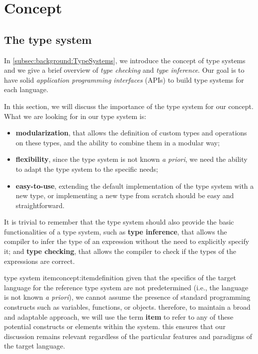 \chapter{Concept}\label{chap:Concept}

\section{The type system}\label{sec:concept:TheTypeSystem}

In \ref{subsec:background:TypeSystems}, we introduce the concept of type systems and we give a brief overview of \textit{type checking} and \textit{type inference}. Our goal is to have solid \textit{application programming interfaces} (APIs) to build type systems for each language.

In this section, we will discuss the importance of the type system for our concept.
What we are looking for in our type system is:
\begin{itemize}
    \item \textbf{modularization}, that allows the definition of custom types and operations on these types, and the ability to combine them in a modular way;
    \item \textbf{flexibility}, since the type system is not known \textit{a priori}, we need the ability to adapt the type system to the specific needs;
    \item \textbf{easy-to-use}, extending the default implementation of the type system with a new type, or implementing a new type from scratch should be easy and straightforward.
\end{itemize}

It is trivial to remember that the type system should also provide the basic functionalities of a type system, such as \textbf{type inference}, that allows the compiler to infer the type of an expression without the need to explicitly specify it; and \textbf{type checking}, that allows the compiler to check if the types of the expressions are correct.

\begin{mydefinition}{type system item}{concept:itemdefinition}
    given that the specifics of the target language for the reference type system are not predetermined (i.e., the language is not known \textit{a priori}), we cannot assume the presence of standard programming constructs such as variables, functions, or objects. therefore, to maintain a broad and adaptable approach, we will use the term \textbf{item} to refer to any of these potential constructs or elements within the system. this ensures that our discussion remains relevant regardless of the particular features and paradigms of the target language.
\end{mydefinition}

